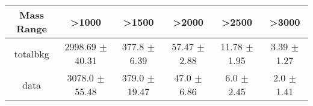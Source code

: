 \begin{footnotesize} 
\begin{tabular}{c|c|c|c|c|c} 
Mass Range & >1000 & >1500 & >2000 & >2500 & >3000 \\ 
\hline\hline 
totalbkg & 2998.69 $\pm$ 40.31 & 377.8 $\pm$ 6.39 & 57.47 $\pm$ 2.88 & 11.78 $\pm$ 1.95 & 3.39 $\pm$ 1.27\\ 
data & 3078.0 $\pm$ 55.48 & 379.0 $\pm$ 19.47 & 47.0 $\pm$ 6.86 & 6.0 $\pm$ 2.45 & 2.0 $\pm$ 1.41\\ 
\hline\hline 
\end{tabular} 
\end{footnotesize} 
\newline 
